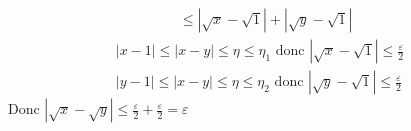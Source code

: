 \begin{exm}
\begin{itemize}
\begin{align*}
																					 &\le \left| \sqrt{x} -\sqrt{1}  \right| + \left| \sqrt{y} -\sqrt{1}  \right| 
			\end{align*}
			\begin{align*}
				\left| x-1 \right| \le \left| x - y \right| \le \eta \le \eta_1 \text{ donc } \left| \sqrt{x}  - \sqrt{1}  \right| \le \frac{\varepsilon}{2}\\
				\left| y-1 \right| \le \left| x - y \right| \le \eta \le \eta_2 \text{ donc } \left| \sqrt{y}  - \sqrt{1}  \right| \le \frac{\varepsilon}{2}
		\end{align*}
		Donc $\left| \sqrt{x} - \sqrt{y} \right| \le \frac{\varepsilon}{2} + \frac{\varepsilon}{2} = \varepsilon$
	\end{itemize}
\end{exm}

